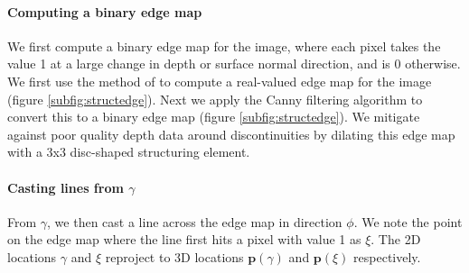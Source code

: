 \documentclass[10pt,twocolumn,letterpaper]{article}
\newcommand{\pixelidx}{\gamma}
\newcommand{\edgeimidx}{\xi}
\newcommand{\project}{\mathbf{p}}
\newcommand{\point}{\mathbf{p}}
\begin{document}
\paragraph{Computing a binary edge map}
We first compute a binary edge map for the image, where each pixel takes the value 1 at a large change in depth or surface normal direction, and is 0 otherwise.
We first use the method of \cite{dollar-iccv-2013} to compute a real-valued edge map for the image (figure \ref{subfig:structedge}).
Next we apply the Canny filtering algorithm \cite{} to convert this to a binary edge map (figure \ref{subfig:structedge}).
We mitigate against poor quality depth data around discontinuities by dilating this edge map with a 3x3 disc-shaped structuring element.

\paragraph{Casting lines from $\pixelidx$}
From $\pixelidx$, we then cast a line across the edge map in direction $\phi$.
We note the point on the edge map where the line first hits a pixel with value 1 as $\edgeimidx$.
The 2D locations $\pixelidx$ and $\edgeimidx$ reproject to 3D locations $\project(\pixelidx)$ and $\project(\edgeimidx)$ respectively.
\end{document}
